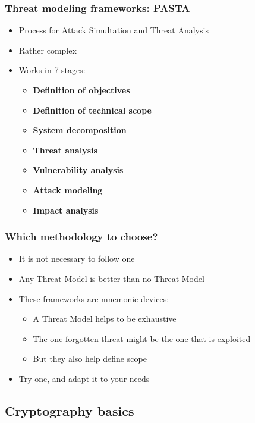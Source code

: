 \begin{frame}
  \frametitle{Threat modeling frameworks: PASTA}
  \begin{itemize}
    \item Process for Attack Simultation and Threat Analysis
    \item Rather complex
    \item Works in 7 stages:
    \begin{itemize}
      \item \textbf{Definition of objectives}
      \item \textbf{Definition of technical scope}
      \item \textbf{System decomposition}
      \item \textbf{Threat analysis}
      \item \textbf{Vulnerability analysis}
      \item \textbf{Attack modeling}
      \item \textbf{Impact analysis}
    \end{itemize}
  \end{itemize}
\end{frame}

\begin{frame}
  \frametitle{Which methodology to choose?}
  \begin{itemize}
    \item It is not necessary to follow one
    \item Any Threat Model is better than no Threat Model
    \item These frameworks are mnemonic devices:
    \begin{itemize}
      \item A Threat Model helps to be exhaustive
      \item The one forgotten threat might be the one that is exploited
      \item But they also help define scope
    \end{itemize}
    \item Try one, and adapt it to your needs
  \end{itemize}
\end{frame}

\subsection{Cryptography basics}

